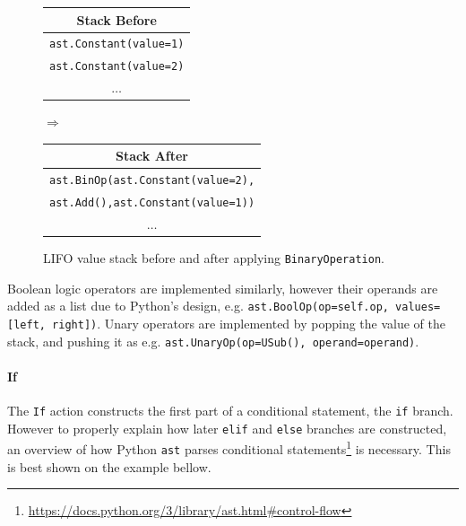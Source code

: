 \begin{figure}[H]\label{fig:binaryOperation-stack}
  \centering
  {\small

  \begin{tabular}{|c|}
    \hline
    \textbf{Stack Before} \\ \hline
    \texttt{\tiny{ast.}}\texttt{Constant(value=1)}\\ \hline
    \texttt{\tiny{ast.}}\texttt{Constant(value=2)}\\ \hline
    \(\dots\)             \\ \hline
  \end{tabular}
  \hspace{0.25em}$\Longrightarrow$\hspace{0.25em}
  \begin{tabular}{|c|}
    \hline
    \textbf{Stack After} \\ \hline
    \texttt{\tiny{ast.}}\texttt{BinOp(}\texttt{\tiny{ast.}}\texttt{Constant(value=2),}\\
    \texttt{\tiny{ast.}}\texttt{Add(),}\texttt{\tiny{ast.}}\texttt{Constant(value=1))} \\ \hline
    \(\dots\)                       \\ \hline
  \end{tabular}
  }
  \caption{LIFO value stack before and after applying \texttt{BinaryOperation}.}
  \label{fig:binaryOperation-stack}
\end{figure}

Boolean logic operators are implemented similarly, however their operands are added as a list due to Python's design, e.g. \texttt{ast.BoolOp(op=self.op, values=[left, right])}. Unary operators are implemented by popping the value of the stack, and pushing it as e.g. \texttt{ast.UnaryOp(op=USub(), operand=operand)}.

\paragraph{If}
The \texttt{If} action constructs the first part of a conditional statement, the \texttt{if} branch. However to properly explain how later \texttt{elif} and \texttt{else} branches are constructed, an overview of how Python \texttt{ast} parses conditional statements\footnote{\url{https://docs.python.org/3/library/ast.html\#control-flow}} is necessary. This is best shown on the example bellow.

